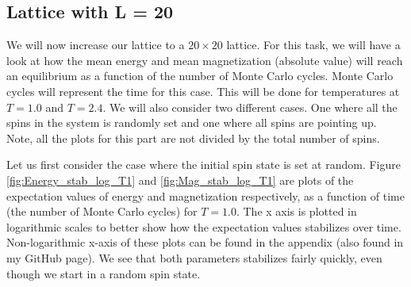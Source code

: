 \documentclass[12pt]{article}
\begin{document}
\subsection{Lattice with L = 20}
We will now increase our lattice to a $20\times 20$ lattice.  For this task, we will have a look at how the mean energy and mean magnetization (absolute value) will reach an equilibrium as a function of the number of Monte Carlo cycles. Monte Carlo cycles will represent the time for this case. This will be done for temperatures at $T=1.0$ and $T = 2.4$. We will also consider two different cases. One where all the spins in the system is randomly set and one where all spins are pointing up. Note, all the plots for this part are not divided by the total number of spins.
 
Let us first consider the case where the initial spin state is set at random. Figure \ref{fig:Energy_stab_log_T1} and \ref{fig:Mag_stab_log_T1} are plots of the expectation values of energy and magnetization respectively, as a function of time (the number of Monte Carlo cycles) for $T = 1.0$. The x axis is plotted in logarithmic scales to better show how the  expectation values stabilizes over time. Non-logarithmic x-axis of these plots can be found in the appendix (also found in my GitHub page). We see that both parameters stabilizes fairly quickly, even though we start in a random spin state.
\end{document}
